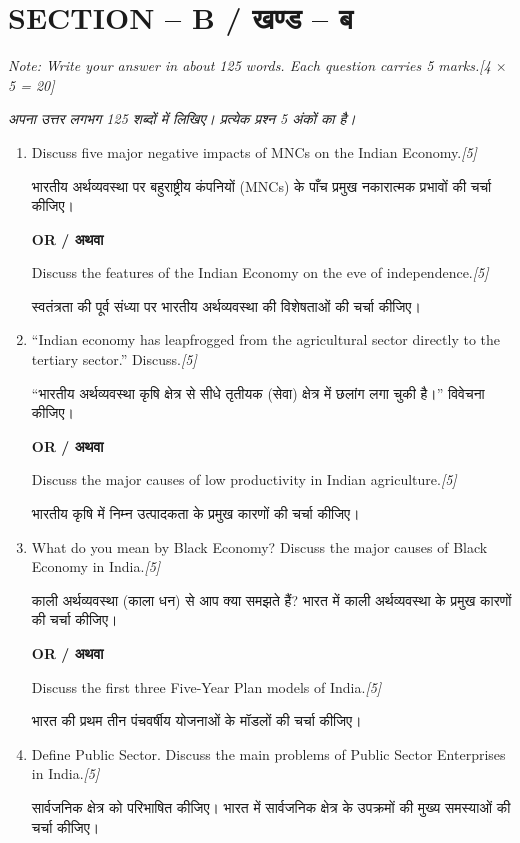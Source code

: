 \documentclass[11pt,a4paper]{article}
\newcommand{\pts}[1]{\hfill \textit{[#1]}}
\begin{document}
\bigskip

\section*{SECTION -- B / खण्ड -- ब}
\noindent \textit{Note: Write your answer in about 125 words. Each question carries 5 marks.}\pts{4 $\times$ 5 = 20}

\noindent \textit{अपना उत्तर लगभग 125 शब्दों में लिखिए। प्रत्येक प्रश्न 5 अंकों का है।}

\begin{enumerate}[label=\textbf{\arabic*.},leftmargin=*,start=2,itemsep=12pt]

  \item Discuss five major negative impacts of MNCs on the Indian Economy.\pts{5}
  
  भारतीय अर्थव्यवस्था पर बहुराष्ट्रीय कंपनियों (MNCs) के पाँच प्रमुख नकारात्मक प्रभावों की चर्चा कीजिए।

  \begin{center}\textbf{OR / अथवा}\end{center}

  Discuss the features of the Indian Economy on the eve of independence.\pts{5}
  
  स्वतंत्रता की पूर्व संध्या पर भारतीय अर्थव्यवस्था की विशेषताओं की चर्चा कीजिए।

  \item ``Indian economy has leapfrogged from the agricultural sector directly to the tertiary sector.'' Discuss.\pts{5}
  
  ``भारतीय अर्थव्यवस्था कृषि क्षेत्र से सीधे तृतीयक (सेवा) क्षेत्र में छलांग लगा चुकी है।'' विवेचना कीजिए।

  \begin{center}\textbf{OR / अथवा}\end{center}

  Discuss the major causes of low productivity in Indian agriculture.\pts{5}
  
  भारतीय कृषि में निम्न उत्पादकता के प्रमुख कारणों की चर्चा कीजिए।

  \item What do you mean by Black Economy? Discuss the major causes of Black Economy in India.\pts{5}
  
  काली अर्थव्यवस्था (काला धन) से आप क्या समझते हैं? भारत में काली अर्थव्यवस्था के प्रमुख कारणों की चर्चा कीजिए।

  \begin{center}\textbf{OR / अथवा}\end{center}

  Discuss the first three Five-Year Plan models of India.\pts{5}
  
  भारत की प्रथम तीन पंचवर्षीय योजनाओं के मॉडलों की चर्चा कीजिए।

  \item Define Public Sector. Discuss the main problems of Public Sector Enterprises in India.\pts{5}
  
  सार्वजनिक क्षेत्र को परिभाषित कीजिए। भारत में सार्वजनिक क्षेत्र के उपक्रमों की मुख्य समस्याओं की चर्चा कीजिए।

\end{enumerate}
\end{document}
